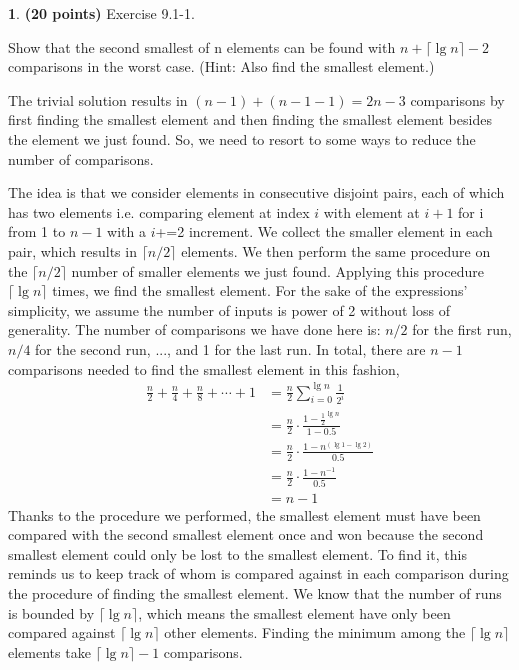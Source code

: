 \documentclass[11pt]{article}
\theoremstyle{definition}
\theoremstyle{theorem}
\newtheorem{prob}{}
\newcommand{\solution}{\medskip\noindent{\color{DarkBlue}\textbf{Solution:}}}
\begin{document}
\newpage
\begin{prob} \textbf{(20 points)} Exercise 9.1-1.
\end{prob}
Show that the second smallest of n elements can be found with $n + \lceil{\lg n}\rceil - 2$ comparisons in the worst case. (Hint: Also find the smallest element.)

\solution

The trivial solution results in $(n - 1) + (n - 1 - 1) = 2n - 3$ comparisons by first finding the smallest element and then finding the smallest element besides the element we just found. So, we need to resort to some ways to reduce the number of comparisons. 

The idea is that we consider elements in consecutive disjoint pairs, each of which has two elements i.e. comparing element at index $i$ with element at $i+1$ for i from 1 to $n-1$ with a $i$+=2 increment. We collect the smaller element in each pair, which results in $\lceil n/2 \rceil$ elements. We then perform the same procedure on the $\lceil n/2 \rceil$ number of smaller elements we just found. Applying this procedure $\lceil \lg n \rceil$ times, we find the smallest element. For the sake of the expressions' simplicity, we assume the number of inputs is power of 2  without loss of generality. The number of comparisons we have done here is: $n/2$ for the first run, $n/4$ for the second run, ..., and 1 for the last run. In total, there are $n-1$ comparisons needed to find the smallest element in this fashion,
\[
\begin{split}
\frac{n}{2} + \frac{n}{4} + \frac{n}{8} + \cdots + 1 &= \frac{n}{2} \sum_{i=0}^{\lg n} \frac{1}{2^i} \\
&= \frac{n}{2} \cdot \frac{1-\frac{1}{2}^{\lg n}}{1 - 0.5} \\
&= \frac{n}{2} \cdot \frac{1- n^{(\lg 1 - \lg 2)}}{0.5} \\
&= \frac{n}{2} \cdot \frac{1 - n^{-1}}{0.5} \\
&= n - 1
\end{split}
\]
Thanks to the procedure we performed, the smallest element must have been compared with the second smallest element once and won because the second smallest element could only be lost to the smallest element. To find it, this reminds us to keep track of whom is compared against in each comparison during the procedure of finding the smallest element. We know that the number of runs is bounded by $\lceil \lg n \rceil$, which means the smallest element have only been compared against $\lceil \lg n \rceil$ other elements. Finding the minimum among the $\lceil \lg n \rceil$ elements take $\lceil \lg n \rceil - 1$ comparisons. 
\end{document}
